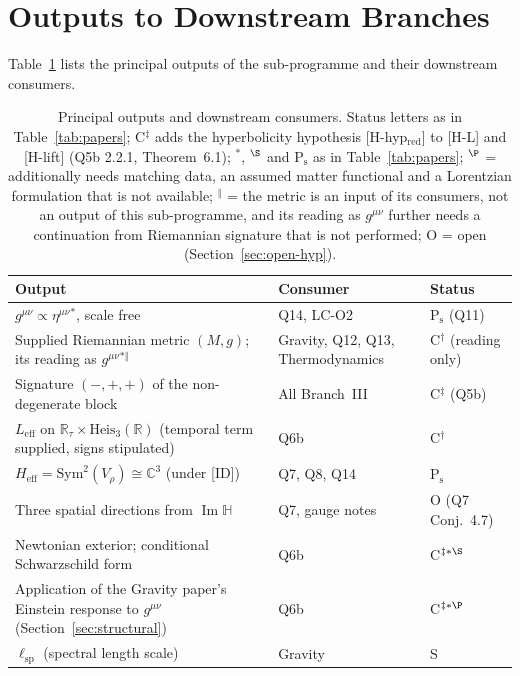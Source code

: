 \documentclass[11pt,a4paper]{article}
\theoremstyle{definition}
\newcommand{\Heis}{\mathrm{Heis}}
\newcommand{\Leff}{L_{\mathrm{eff}}}
\newcommand{\geff}{g^{\mu\nu}}
\newcommand{\Sym}{\mathrm{Sym}}
\renewcommand{\Im}{\operatorname{Im}}
\begin{document}
  \section{Outputs to Downstream Branches}
    \label{sec:outputs}

    Table~\ref{tab:outputs} lists the principal outputs of the sub-programme and their
    downstream consumers.

    \begin{table}[ht]
      \centering
      \caption{Principal outputs and downstream consumers.
      Status letters as in Table~\ref{tab:papers}; C$^{\ddagger}$ adds the hyperbolicity hypothesis
      [H-hyp$_{\mathrm{red}}$] to [H-L] and [H-lift] (Q5b 2.2.1, Theorem~6.1); $^{\ast}$, $^{\S}$ and
      P$_{\mathrm{s}}$ as in Table~\ref{tab:papers}; $^{\P}$ = additionally needs matching data, an assumed matter
      functional and a Lorentzian formulation that is not available; $^{\Vert}$ = the metric is an input of its
      consumers, not an output of this sub-programme, and its reading as $\geff$ further needs a continuation from
      Riemannian signature that is not performed; O = open (Section~\ref{sec:open-hyp}).}
      \label{tab:outputs}
      \renewcommand{\arraystretch}{1.3}
      \begin{tabular}{@{}p{5.5cm}p{4.5cm}l@{}}
        \toprule
        Output & Consumer & Status \\
        \midrule
        $\geff \propto \eta^{\mu\nu}$$^{\ast}$, scale free & Q14, LC-O2 & P$_{\mathrm{s}}$ (Q11) \\
        Supplied Riemannian metric $(M,g)$; its reading as $\geff$$^{\ast\Vert}$ & Gravity, Q12, Q13, Thermodynamics & C$^{\dagger}$ (reading only) \\
        Signature $(-, +, +)$ of the non-degenerate block & All Branch~III & C$^{\ddagger}$ (Q5b) \\
        $\Leff$ on $\mathbb{R}_\tau \times \Heis_3(\mathbb{R})$ (temporal term supplied, signs stipulated) & Q6b & C$^{\dagger}$ \\
        $H_{\mathrm{eff}} = \Sym^2(V_\rho) \cong \mathbb{C}^3$ (under [ID]) & Q7, Q8, Q14 & P$_{\mathrm{s}}$ \\
        Three spatial directions from $\Im\mathbb{H}$ & Q7, gauge notes & O (Q7 Conj.~4.7) \\
        Newtonian exterior; conditional Schwarzschild form & Q6b & C$^{\ddagger\ast\S}$ \\
        Application of the Gravity paper's Einstein response to $\geff$ (Section~\ref{sec:structural}) & Q6b & C$^{\ddagger\ast\P}$ \\
        $\ell_{\mathrm{sp}}$ (spectral length scale) & Gravity~\cite{Beau2026h} & S \\
        \bottomrule
      \end{tabular}
    \end{table}
\end{document}
